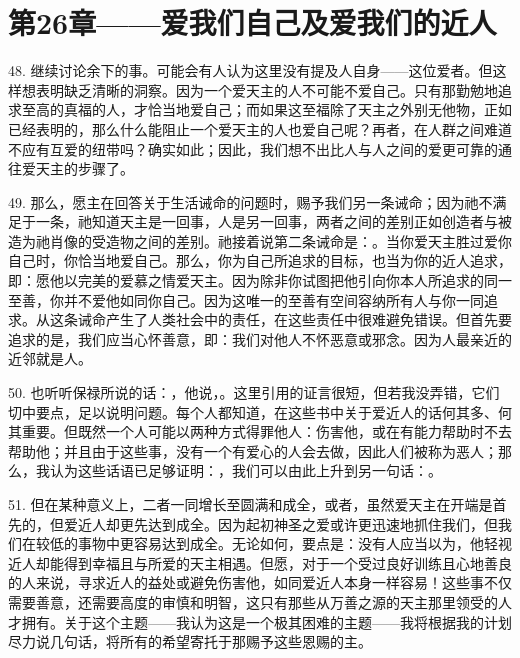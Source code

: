 
\section{第26章——爱我们自己及爱我们的近人}

48. 继续讨论余下的事。可能会有人认为这里没有提及人自身——这位爱者。但这样想表明缺乏清晰的洞察。因为一个爱天主的人不可能不爱自己。只有那勤勉地追求至高的真福的人，才恰当地爱自己；而如果这至福除了天主之外别无他物，正如已经表明的，那么什么能阻止一个爱天主的人也爱自己呢？再者，在人群之间难道不应有互爱的纽带吗？确实如此；因此，我们想不出比人与人之间的爱更可靠的通往爱天主的步骤了。\par

49. 那么，愿主在回答关于生活诫命的问题时，赐予我们另一条诫命；因为祂不满足于一条，祂知道天主是一回事，人是另一回事，两者之间的差别正如创造者与被造为祂肖像的受造物之间的差别。祂接着说第二条诫命是：。当你爱天主胜过爱你自己时，你恰当地爱自己。那么，你为自己所追求的目标，也当为你的近人追求，即：愿他以完美的爱慕之情爱天主。因为除非你试图把他引向你本人所追求的同一至善，你并不爱他如同你自己。因为这唯一的至善有空间容纳所有人与你一同追求。从这条诫命产生了人类社会中的责任，在这些责任中很难避免错误。但首先要追求的是，我们应当心怀善意，即：我们对他人不怀恶意或邪念。因为人最亲近的近邻就是人。\par

50. 也听听保禄所说的话：，他说，。这里引用的证言很短，但若我没弄错，它们切中要点，足以说明问题。每个人都知道，在这些书中关于爱近人的话何其多、何其重要。但既然一个人可能以两种方式得罪他人：伤害他，或在有能力帮助时不去帮助他；并且由于这些事，没有一个有爱心的人会去做，因此人们被称为恶人；那么，我认为这些话语已足够证明：，我们可以由此上升到另一句话：。\par

51. 但在某种意义上，二者一同增长至圆满和成全，或者，虽然爱天主在开端是首先的，但爱近人却更先达到成全。因为起初神圣之爱或许更迅速地抓住我们，但我们在较低的事物中更容易达到成全。无论如何，要点是：没有人应当以为，他轻视近人却能得到幸福且与所爱的天主相遇。但愿，对于一个受过良好训练且心地善良的人来说，寻求近人的益处或避免伤害他，如同爱近人本身一样容易！这些事不仅需要善意，还需要高度的审慎和明智，这只有那些从万善之源的天主那里领受的人才拥有。关于这个主题——我认为这是一个极其困难的主题——我将根据我的计划尽力说几句话，将所有的希望寄托于那赐予这些恩赐的主。\par

